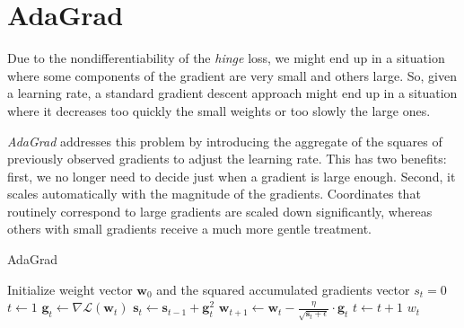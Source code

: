 \section{AdaGrad}

Due to the nondifferentiability of the \emph{hinge} loss, we might end up in a situation where some components of the gradient are very small and others large. So, given a learning rate, a standard gradient descent approach might end up in a situation where it decreases too quickly the small weights or too slowly the large ones.

\emph{AdaGrad} \cite{duchi2011adaptive} addresses this problem by introducing the aggregate of the squares of previously observed gradients to adjust the learning rate. This has two benefits: first, we no longer need to decide just when a gradient is large enough. Second, it scales automatically with the magnitude of the gradients. Coordinates that routinely correspond to large gradients are scaled down significantly, whereas others with small gradients receive a much more gentle treatment.

\begin{algorithm}[h!]
	\caption{AdaGrad}
	\label{alg:adagrad}
	\begin{algorithmic}[1]
			\State Initialize weight vector $\textbf{w}_0$ and the squared accumulated gradients vector $s_t = 0$
			\State $t \gets 1$
				\State $\textbf{g}_t \gets \nabla \mathcal{L}(\textbf{w}_t)$
				\State $\textbf{s}_t \gets \textbf{s}_{t-1} + \textbf{g}_t^2$
				\State $\textbf{w}_{t+1} \gets \textbf{w}_t - \displaystyle \frac{\eta}{\sqrt{\textbf{s}_t + \epsilon}} \cdot \textbf{g}_t$
				\State $t \gets t + 1$
			\EndWhile
			\State \Return $w_t$
		\EndFunction
	\end{algorithmic}
\end{algorithm}
